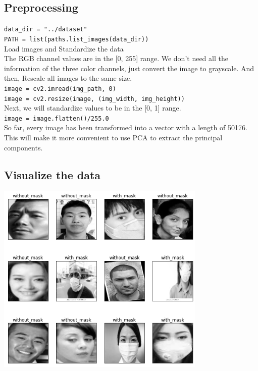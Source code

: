 \documentclass{article}
\newcommand{\code}[1]{\colorbox{light-gray}{\texttt{#1}}}
\begin{document}
\subsection{Preprocessing}
\code{data\_dir = "../dataset"}\\
\code{PATH = list(paths.list\_images(data\_dir))}\\
Load images and Standardize the data\\
The RGB channel values are in the [0, 255] range. We don’t need all the information of the three color channels, just convert the image to grayscale.
And then, Rescale all images to the same size.\\
\code{image = cv2.imread(img\_path, 0)}\\
\code{image = cv2.resize(image, (img\_width, img\_height))}\\
Next, we will standardize values to be in the [0, 1] range.\\
\code{image = image.flatten()/255.0}\\
So far, every image has been transformed into a vector with a length of 50176.
This will make it more convenient to use PCA to extract the principal components.

\subsection{Visualize the data}
\begin{center}
  \includegraphics[width=10cm]{preview1.png}
\end{center}
\end{document}
